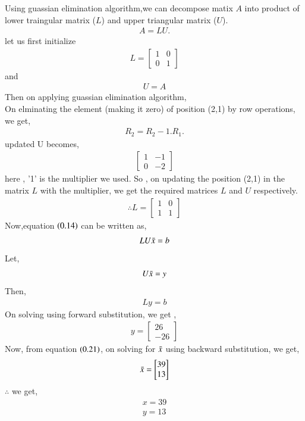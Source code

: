 \documentclass[journal]{IEEEtran}
\begin{document}
 Using guassian elimination algorithm,we can decompose matix $A$ into product of lower traingular matrix ($L$) and upper triangular matrix ($U$).
 \begin{align}
     A = LU.
 \end{align}
 let us first initialize
 \begin{align}
     L = \begin{bmatrix}
         1&0\\
         0&1
     \end{bmatrix}
 \end{align}
 and 
 \begin{align}
     U = A
 \end{align}
 Then on applying guassian elimination algorithm,\\
 On elminating the element (making it zero) of position (2,1) by row operations, we get,
 \begin{align}
     R_2 = R_2 - 1.R_1.
 \end{align}
 updated U becomes,
\begin{align}
    \begin{bmatrix}
        1&-1\\
        0&-2
    \end{bmatrix}
\end{align}
here , '1' is the multiplier we used.
So , on updating the position (2,1) in the matrix $L$ with the multiplier, we get the required matrices $L$ and $U$ respectively.
\begin{align}
    \therefore L = \begin{bmatrix}
        1&0\\
        1&1
    \end{bmatrix}
\end{align}
Now,equation $\left(0.14\right)$ can be written as,
\begin{align}
    LU\Bar{x} = b
\end{align}
Let,
\begin{align}
    U\Bar{x} = y
\end{align}
Then,
\begin{align}
    Ly = b
\end{align}
On solving using forward substitution, we get , 
\begin{align}
    y = \begin{bmatrix}
        26\\
        -26
    \end{bmatrix}
\end{align}
Now, from equation $\left(0.21\right)$, on solving for $\Bar{x}$ using backward substitution, we get,
\begin{align}
    \Bar{x} = \begin{bmatrix}
        39\\
        13
    \end{bmatrix}
\end{align}
$\therefore$ we get,
\begin{align}
    x = 39\\
    y = 13
\end{align}
\end{document}
